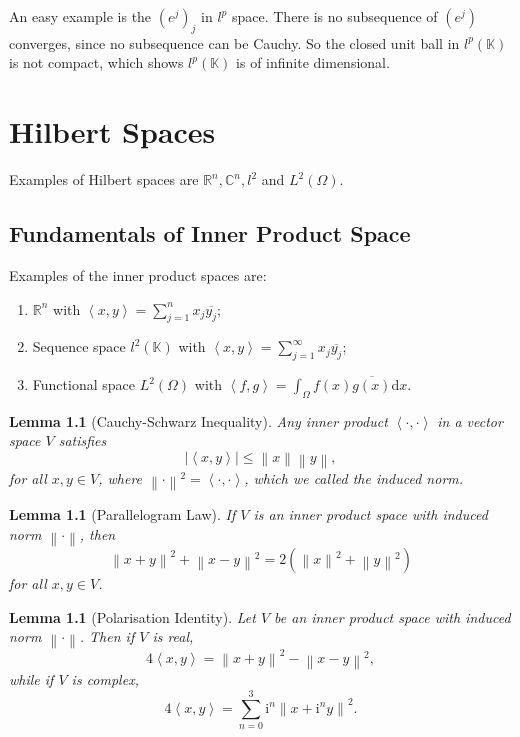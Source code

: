 \documentclass[12pt,a4paper]{report}
\numberwithin{equation}{section}
\theoremstyle{mystyle}
\newtheorem{lemma}[definition]{Lemma}
\newcommand{\R}{\mathbb{R}}
\newcommand{\C}{\mathbb{C}}
\newcommand{\K}{\mathbb{K}}
\renewcommand{\d}{\mathrm{d}}
\renewcommand{\i}{\mathbf{\mathrm{i}}}
\newcommand{\abs}[1]{\left\lvert #1 \right\rvert}
\newcommand{\norm}[1]{\left\lVert #1 \right\rVert}
\newcommand{\inner}[1]{\left\langle #1 \right\rangle}
\begin{document}
	An easy example is the $(e^j)_j$ in $l^p$ space. There is no subsequence of $(e^j)$ converges, since no subsequence can be Cauchy. So the closed unit ball in $l^p(\K)$ is not compact, which shows $l^p(\K)$ is of infinite dimensional.
	
	\chapter{Hilbert Spaces}
	Examples of Hilbert spaces are $\R^n,\C^n,l^2$ and $L^2(\Omega)$.
	\section{Fundamentals of Inner Product Space}
	Examples of the inner product spaces are: 
	\begin{enumerate}
		\item $\R^n$ with $\inner{x,y}=\sum_{j=1}^n x_j \overline{y_j}$;
		\item Sequence space $l^2(\K)$ with $\inner{x,y}=\sum_{j=1}^\infty x_j \overline{y_j}$;
		\item Functional space $L^2(\Omega)$ with $\inner{f,g}=\int_{\Omega} f(x)\overline{g(x)}\d x$.
	\end{enumerate}
	\begin{lemma}[Cauchy-Schwarz Inequality]
		Any inner product $\inner{\cdot,\cdot}$ in a vector space $V$ satisfies
		\begin{equation}
			\abs{\inner{x,y}}\leq \norm{x}\norm{y},
		\end{equation}
		for all $x,y\in V$, where $\norm{\cdot}^2=\inner{\cdot,\cdot}$, which we called the \emph{induced norm}.
	\end{lemma}
	
	\begin{lemma}[Parallelogram Law]
		If $V$ is an inner product space with induced norm $\norm{\cdot}$, then
		\begin{equation}
		\norm{x+y}^2 + \norm{x-y}^2 = 2(\norm{x}^2+\norm{y}^2)
		\label{eq:parallelogram}
		\end{equation}
		for all $x,y\in V$.
	\end{lemma}

	\begin{lemma}[Polarisation Identity]
		Let $V$ be an inner product space with induced norm $\norm{\cdot}$. Then if $V$ is real,
		\begin{equation}
			4\inner{x,y}=\norm{x+y}^2 - \norm{x-y}^2,\label{eq:polar}
		\end{equation}
		while if $V$ is complex,
		\begin{equation}
			4\inner{x,y}=\sum_{n=0}^3 \i^n \norm{x+\i^n y}^2.
		\end{equation}
	\end{lemma}
	
\end{document}
